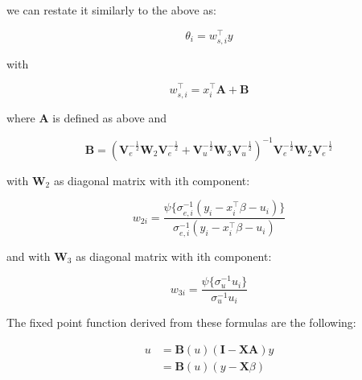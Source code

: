 we can restate it similarly to the above as:

\[
\theta_i = w_{s, i}^\top y
\]

with

\[
w_{s, i}^\top = x_i^\top \mathbf{A} + \mathbf{B}
\]

where $\mathbf{A}$ is defined as above and

\[
\mathbf{B} = 
\left(
  \mathbf{V}_e^{-\frac{1}{2}} \mathbf{W}_2 \mathbf{V}_e^{-\frac{1}{2}} +
  \mathbf{V}_u^{-\frac{1}{2}} \mathbf{W}_3 \mathbf{V}_u^{-\frac{1}{2}}
\right)^{-1} 
\mathbf{V}_e^{-\frac{1}{2}} \mathbf{W}_2 \mathbf{V}_e^{-\frac{1}{2}}
\]

with $\mathbf{W}_2$ as diagonal matrix with ith component:

\[
w_{2i} = 
\frac{
  \psi\{\sigma^{-1}_{e, i} (y_i - x_i^\top \beta - u_i)\}
}{
  \sigma^{-1}_{e, i} (y_i - x_i^\top \beta - u_i)
}
\]

and with $\mathbf{W}_3$ as diagonal matrix with ith component:

\[
w_{3i} = \frac{
  \psi\{\sigma_u^{-1} u_i\}
}{
  \sigma_u^{-1} u_i
}
\]

The fixed point function derived from these formulas are the following:

\begin{align*}
u &= \mathbf{B}(u)\left(\mathbf{I} - \mathbf{X}\mathbf{A}\right)y \\
  &= \mathbf{B}(u)\left(y - \mathbf{X}\beta\right)
\end{align*}

